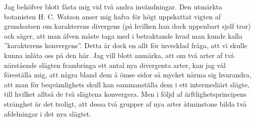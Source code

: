 Jag behöfver blott fästa mig vid två andra invändningar. Den utmärkta botanisten H. C. Watson anser mig hafva för högt uppskattat vigten af grundsatsen om karakterens divergens (på hvilken han dock uppenbart sjelf tror) och säger, att man äfven måste taga med i betraktande hvad man kunde kalla ”karakterens konvergens”. Detta är dock en allt för invecklad fråga, att vi skulle kunna inlåta oss på den här. Jag vill blott anmärka, att om två arter af två närstående slägten frambringa ett antal nya divergenta arter, kan jag väl föreställa mig, att några bland dem å ömse sidor så mycket närma sig hvarandra, att man för beqvämlighets skull kan sammanställa dem i ett intermediärt slägte, till hvilket alltså de två slägtena konvergera. Men i följd af ärftlighetsprincipens stränghet är det troligt, att dessa två grupper af nya arter åtminstone bilda två afdelningar i det nya slägtet.

